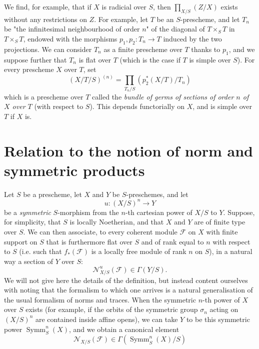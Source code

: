   We find, for example, that if \(X\) is radicial over \(S\), then \(\prod _{X/S}(Z/X)\) exists without any restrictions on \(Z\).
  For example, let \(T\) be an \(S\)-prescheme, and let \(T_n\) be "the infinitesimal neighbourhood of order \(n\)" of the diagonal of \(T\times _S T\) in \(T\times _S T\), endowed with the morphisms \(p_1,p_2\colon  T_n\to  T\) induced by the two projections.
  We can consider \(T_n\) as a finite prescheme over \(T\) thanks to \(p_1\), and we suppose further that \(T_n\) is flat over \(T\) (which is the case if \(T\) is simple over \(S\)).
  For every prescheme \(X\) over \(T\), set
  \[     (X/T/S)^{(n)}     = \prod _{T_n/S}(p_2^*(X/T)/T_n)   \]
  which is a prescheme over \(T\) called the \emph{bundle of germs of sections of order \(n\) of \(X\) over \(T\)} (with respect to \(S\)).
  This depends functorially on \(X\), and is simple over \(T\) if \(X\) is.\chapter{Relation to the notion of norm and symmetric products}\thispagestyle{fancy}\label{fga3.iv-6}\par{}Let \(S\) be a prescheme, let \(X\) and \(Y\) be \(S\)-preschemes, and let
  \[     u\colon (X/S)^n\to  Y   \]
  be a \emph{symmetric} \(S\)-morphism from the \(n\)-th cartesian power of \(X/S\) to \(Y\).
  Suppose, for simplicity, that \(S\) is locally Noetherian, and that \(X\) and \(Y\) are of finite type over \(S\).
  We can then associate, to every coherent module \(\mathscr {F}\) on \(X\) with finite support on \(S\) that is furthermore flat over \(S\) and of rank equal to \(n\) with respect to \(S\) (i.e. such that \(f_*(\mathscr {F})\) is a locally free module of rank \(n\) on \(S\)), in a natural way a section of \(Y\) over \(S\):
  \[     \mathscr {N}_{X/S}^u(\mathscr {F}) \in  \Gamma (Y/S).   \]
  We will not give here the details of the definition, but instead content ourselves with noting that the formalism to which one arrives is a natural generalisation of the usual formalism of norms and traces.
  When the symmetric \(n\)-th power of \(X\) over \(S\) exists (for example, if the orbits of the symmetric group \(\sigma _n\) acting on \((X/S)^n\) are contained inside affine opens), we can take \(Y\) to be this symmetric power \(\operatorname {Symm}_S^n(X)\), and we obtain a canonical element
  \[     \mathscr {N}_{X/S}(\mathscr {F}) \in  \Gamma (\operatorname {Symm}_S^n(X)/S)   \]
  
